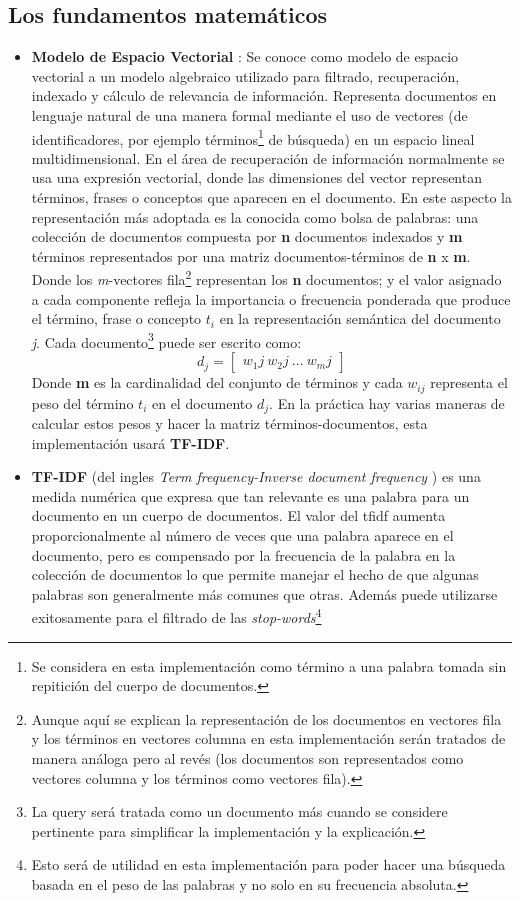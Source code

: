 \documentclass{article}
\begin{document}
\subsection{Los fundamentos matemáticos}
\begin{itemize}
\item \textbf{Modelo de Espacio Vectorial} : Se conoce como modelo de espacio vectorial a un modelo algebraico utilizado para filtrado, recuperación, indexado y cálculo de relevancia de información. Representa documentos en lenguaje natural de una manera formal mediante el uso de vectores (de identificadores, por ejemplo términos\footnote{Se considera en esta implementación como término a una palabra tomada sin repitición del cuerpo de documentos.} de búsqueda) en un espacio lineal multidimensional.
En el área de recuperación de información normalmente se usa una expresión vectorial, donde las dimensiones del vector representan términos, frases o conceptos que aparecen en el documento. En este aspecto la representación más adoptada es la conocida como bolsa de palabras: una colección de documentos compuesta por \textbf{n} documentos indexados y \textbf{m} términos representados por una matriz documentos-términos de \textbf{n} x \textbf{m}. Donde los \textit{m}-vectores fila\footnote{Aunque aquí se explican la representación de los documentos en vectores fila y los términos en vectores columna en esta implementación serán tratados de manera análoga pero al revés (los documentos son representados como vectores columna y los términos como vectores fila). } representan los \textbf{n} documentos; y el valor asignado a cada componente refleja la importancia o frecuencia ponderada que produce el término, frase o concepto $t_{i}$ en la representación semántica del documento \textit{j}.
Cada documento\footnote{La query será tratada como un documento más cuando se considere pertinente para simplificar la implementación y la explicación.} puede ser escrito como:
\begin{equation}\label{eq:1} d_{j} = \begin{bmatrix} w_1j \ w_2j \ \hdots \ w_mj \end{bmatrix} 
\end{equation} 
Donde \textbf{m} es la cardinalidad del conjunto de términos y cada $w_{ij}$ representa el peso del término $t_{i}$ en el documento $d_{j}$. En la práctica hay varias maneras de calcular estos pesos y hacer la matriz términos-documentos, esta implementación usará \textbf{TF-IDF}.
\item \textbf{TF-IDF} (del ingles \textit{Term frequency-Inverse document frequency }) es una medida numérica que expresa que tan relevante es una palabra para un documento en un cuerpo de documentos. El valor del tfidf aumenta proporcionalmente al número de veces que una palabra aparece en el documento, pero es compensado por la frecuencia de la palabra en la colección de documentos lo que permite manejar el hecho de que algunas palabras son generalmente más comunes que otras. Además puede utilizarse exitosamente para el filtrado de las \textit{stop-words}\footnote{Esto será de utilidad en esta implementación para poder hacer una búsqueda basada en el peso de las palabras y no solo en su frecuencia absoluta.}

\end{itemize}
\end{document}
